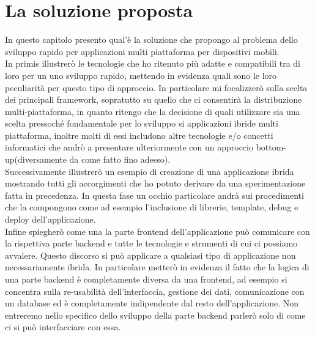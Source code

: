 \chapter{La soluzione proposta}
In questo capitolo presento qual'è la soluzione che propongo al problema dello sviluppo rapido per applicazioni multi piattaforma per dispositivi mobili.\\
In primis illustrerò le tecnologie che ho ritenuto più adatte e compatibili tra di loro per un uno sviluppo rapido, mettendo in evidenza quali sono le loro peculiarità per questo tipo di approccio. In particolare mi focalizzerò sulla scelta dei principali framework, sopratutto su quello che ci consentirà la distribuzione multi-piattaforma, in quanto ritengo che la decisione di quali utilizzare sia una scelta pressoché fondamentale per lo sviluppo si applicazioni ibride multi piattaforma, inoltre molti di essi includono altre tecnologie e/o concetti informatici che andrò a presentare ulteriormente con un approccio bottom-up(diversamente da come fatto fino adesso).\\

Successivamente illustrerò un esempio di creazione di una applicazione ibrida mostrando tutti gli accorgimenti che ho potuto 
derivare da una sperimentazione fatta in precedenza. In questa fase un occhio particolare andrà sui procedimenti che la compongono come ad esempio l'inclusione di librerie, template, debug e deploy dell'applicazione.\\

Infine spiegherò come una la parte frontend dell'applicazione può comunicare con la rispettiva parte backend e tutte le tecnologie e strumenti di cui ci possiamo avvalere. Questo discorso si può applicare a qualsiasi tipo di applicazione non necessariamente ibrida. In particolare metterò in evidenza il fatto che la logica di una parte backend è completamente diversa da una frontend, ad esempio si concentra sulla re-usabilità dell'interfaccia, gestione dei dati, comunicazione con un database ed è completamente indipendente dal resto dell'applicazione. Non entreremo nello specifico dello sviluppo della parte backend parlerò solo di come ci si può interfacciare con essa.
